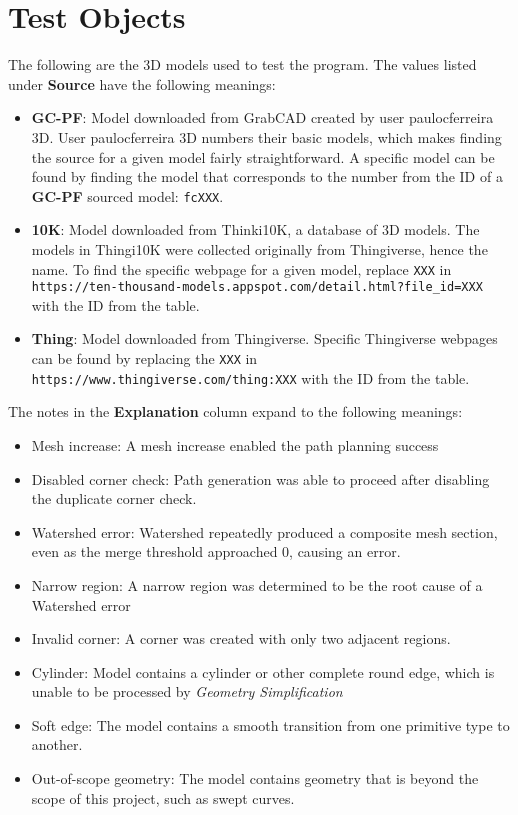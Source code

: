 \chapter{Test Objects}\label{app:model_table}

The following are the 3D models used to test the program.
The values listed under \textbf{Source} have the following meanings:
\begin{itemize}
	\item \textbf{GC-PF}: Model downloaded from GrabCAD created by user paulocferreira 3D\cite{GC-PF}.
		User paulocferreira 3D numbers their basic models, which makes finding the source for a given model fairly straightforward.
		A specific model can be found by finding the model that corresponds to the number from the ID of a \textbf{GC-PF} sourced model: \verb|fcXXX|.
	\item \textbf{10K}: Model downloaded from Thinki10K, a database of 3D models\cite{Thingi10K_paper, Thingi10K_app}.
		The models in Thingi10K were collected originally from Thingiverse, hence the name.
		To find the specific webpage for a given model, replace \verb|XXX| in \verb|https://ten-thousand-models.appspot.com/detail.html?file_id=XXX| with the ID from the table.
	\item \textbf{Thing}: Model downloaded from Thingiverse.
		Specific Thingiverse webpages can be found by replacing the \verb|XXX| in \verb|https://www.thingiverse.com/thing:XXX| with the ID from the table.
\end{itemize}

The notes in the \textbf{Explanation} column expand to the following meanings:
\begin{itemize}
	\item Mesh increase: A mesh increase enabled the path planning success
	\item Disabled corner check: Path generation was able to proceed after disabling the duplicate corner check.
	\item Watershed error: Watershed repeatedly produced a composite mesh section, even as the merge threshold approached 0, causing an error.
	\item Narrow region: A narrow region was determined to be the root cause of a Watershed error
	\item Invalid corner: A corner was created with only two adjacent regions.
	\item Cylinder: Model contains a cylinder or other complete round edge, which is unable to be processed by \textit{Geometry Simplification}
	\item Soft edge: The model contains a smooth transition from one primitive type to another.
	\item Out-of-scope geometry: The model contains geometry that is beyond the scope of this project, such as swept curves.
\end{itemize}

